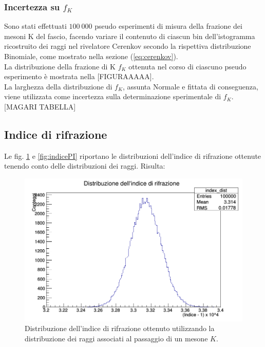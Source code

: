 \documentclass[8pt]{extarticle}
\begin{document}
\subsubsection{Incertezza su $f_K$}
Sono stati effettuati $100\ 000$ pseudo esperimenti di misura della frazione dei mesoni K del fascio, facendo variare il contenuto di ciascun bin dell'istogramma ricostruito dei raggi nel rivelatore Cerenkov secondo la rispettiva distribuzione Binomiale, come mostrato nella sezione (\ref{eq:cerenkov}).\\
La distribuzione della frazione di K $f_K$ ottenuta nel corso di ciascuno pseudo esperimento è mostrata nella [FIGURAAAAA]. \\
La larghezza della distribuzione di $f_K$, assunta Normale e fittata di conseguenza, viene utilizzata come incertezza sulla determinazione sperimentale di $f_K$.
[MAGARI TABELLA]
\subsection{Indice di rifrazione}
Le fig. \ref{fig:indiceK} e \ref{fig:indicePI} riportano le distribuzioni dell'indice di rifrazione ottenute tenendo conto delle distribuzioni dei raggi. Risulta: \\

\begin{figure}
\begin{center}
\includegraphics[scale=0.4]{indiceK_definitivo}
\caption{Distribuzione dell'indice di rifrazione ottenuto utilizzando la distribuzione dei raggi associati al passaggio di un mesone $K$.}
\label{fig:indiceK}
\end{center}
\end{figure}
\end{document}
